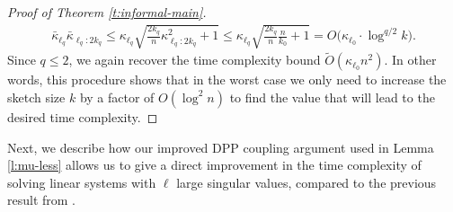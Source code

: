 \documentclass[11pt]{article}
\begin{document}
\begin{proof}[Proof of Theorem \ref{t:informal-main}]
\begin{align*}
\bar\kappa_{\ell_q}\bar\kappa_{\ell_q:2k_q}\leq \kappa_{\ell_q}\sqrt{\frac{2k_q}{n}\kappa_{\ell_q:2k_q}^2+1}
\leq \kappa_{\ell_q}\sqrt{\frac{2k_q}{n}\frac{n}{k_0}+1} = O\big(\kappa_{\ell_0}\cdot \log^{q/2}k\big).
\end{align*}
Since $q\leq 2$, we again recover the time complexity bound $\tilde O(\kappa_{\ell_0}n^2)$. In other words, this procedure shows that in the worst case we only need to increase the sketch size $k$ by a factor of $O(\log^2 n)$ to find the value that will lead to the desired time complexity.
\end{proof}
\smallskip

\noindent
Next, we describe how our improved DPP coupling argument used in Lemma \ref{l:mu-less} allows us to give a direct improvement in the time complexity of solving linear systems with $\ell$ large singular values, compared to the previous result from \cite{derezinski2023solving}.
\end{document}
